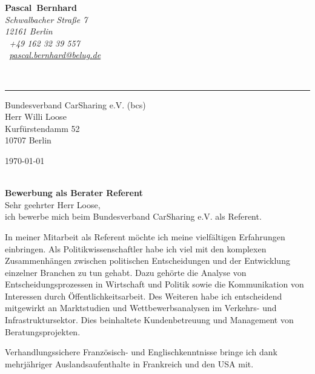 \documentclass[11pt,a4paper]{article}
\def\firstname{Pascal}
\def\familyname{Bernhard}
\begin{document}
\sffamily   %
\hfill%
\begin{minipage}[t]{.6\textwidth}
	\raggedleft%
	{\bfseries {\color{firstnamecolor}\firstname}~{\color{familynamecolor}\familyname}}\\[.35ex]
	\small\itshape%
	Schwalbacher Straße 7\\
	12161 Berlin\\[.35ex]
	\Mobilefone~+49 162 32 39 557 \\
	\Letter~\href{mailto:pascal.bernhard@belug.de}{pascal.bernhard@belug.de}
\end{minipage}\\[0.5em]
%
{\color{firstnamecolor}\rule{\textwidth}{.25ex}}
%
\begin{minipage}[t]{.4\textwidth}
	\raggedright%
	\vspace*{1em}
	Bundesverband CarSharing e.V. (bcs) \\
	Herr Willi Loose\\[.35ex]
	\small%
	Kurfürstendamm 52\\
	10707 Berlin
\end{minipage}
%
\hfill
%
\begin{minipage}[t]{.4\textwidth}
	\raggedleft %
	\today
\end{minipage}\\[1em]


{\bfseries \color{familynamecolor}Bewerbung als Berater Referent}\\[0.75em]

Sehr geehrter Herr Loose,\\[0.5em]
%
ich bewerbe mich beim Bundesverband CarSharing e.V. als Referent.

In meiner Mitarbeit als Referent möchte ich meine vielfältigen Erfahrungen einbringen. Als Politikwissenschaftler habe ich viel mit den komplexen Zusammen­hängen zwischen politischen Entscheidungen und der Entwicklung einzelner Branchen zu tun gehabt. Dazu gehörte die Analyse von Entscheidungsprozessen in Wirtschaft und Politik sowie die Kommunikation von Interessen durch Öffentlichkeitsarbeit. Des Weiteren habe ich entscheidend mitgewirkt an Marktstudien und Wettbewerbsanalysen im Verkehrs- und Infrastruktursektor. Dies beinhaltete Kundenbetreuung und Management von Beratungsprojekten.

Verhandlungssichere Französisch- und Englischkenntnisse bringe ich dank mehrjähriger Auslandsaufenthalte in Frankreich und den USA mit.
\end{document}
